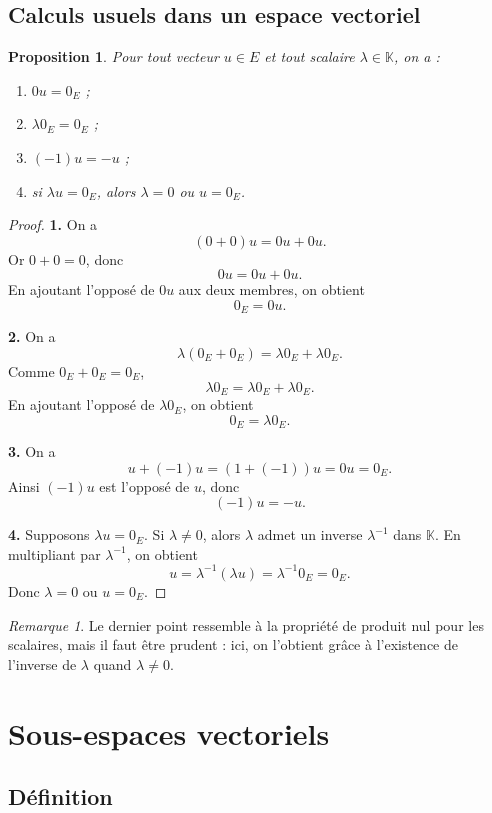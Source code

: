 \documentclass[11pt,a4paper]{article}
\newtheorem{proposition}[definition]{Proposition}
\theoremstyle{remark}
\newtheorem{remarque}[definition]{Remarque}
\newcommand{\K}{\mathbb{K}}
\begin{document}
\subsection{Calculs usuels dans un espace vectoriel}

\begin{proposition}
Pour tout vecteur \(u\in E\) et tout scalaire \(\lambda\in\K\), on a :
\begin{enumerate}
    \item \(0u=0_E\) ;
    \item \(\lambda 0_E=0_E\) ;
    \item \((-1)u=-u\) ;
    \item si \(\lambda u=0_E\), alors \(\lambda=0\) ou \(u=0_E\).
\end{enumerate}
\end{proposition}

\begin{proof}
\textbf{1.} On a
\[
(0+0)u=0u+0u.
\]
Or \(0+0=0\), donc
\[
0u=0u+0u.
\]
En ajoutant l’opposé de \(0u\) aux deux membres, on obtient
\[
0_E=0u.
\]

\textbf{2.} On a
\[
\lambda(0_E+0_E)=\lambda 0_E+\lambda 0_E.
\]
Comme \(0_E+0_E=0_E\),
\[
\lambda 0_E=\lambda 0_E+\lambda 0_E.
\]
En ajoutant l’opposé de \(\lambda 0_E\), on obtient
\[
0_E=\lambda 0_E.
\]

\textbf{3.} On a
\[
u+(-1)u=(1+(-1))u=0u=0_E.
\]
Ainsi \((-1)u\) est l’opposé de \(u\), donc
\[
(-1)u=-u.
\]

\textbf{4.} Supposons \(\lambda u=0_E\).  
Si \(\lambda\neq 0\), alors \(\lambda\) admet un inverse \(\lambda^{-1}\) dans \(\K\). En multipliant par \(\lambda^{-1}\), on obtient
\[
u=\lambda^{-1}(\lambda u)=\lambda^{-1}0_E=0_E.
\]
Donc \(\lambda=0\) ou \(u=0_E\).
\end{proof}

\begin{remarque}
Le dernier point ressemble à la propriété de produit nul pour les scalaires, mais il faut être prudent : ici, on l’obtient grâce à l’existence de l’inverse de \(\lambda\) quand \(\lambda\neq 0\).
\end{remarque}

\section{Sous-espaces vectoriels}

\subsection{Définition}
\end{document}
